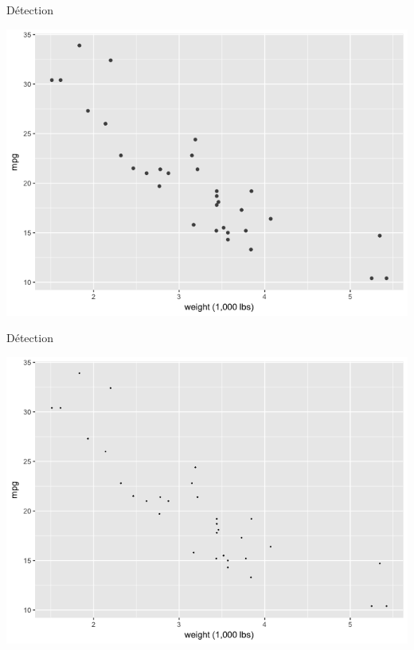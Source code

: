 \documentclass[french]{beamer}
\begin{document}
\begin{frame}{Détection}
\begin{center}
	\includegraphics[height=0.8\textheight]{det}
\end{center}
\end{frame}

\begin{frame}{Détection}
\begin{center}
	\includegraphics[height=0.8\textheight]{det2}
\end{center}
\end{frame}
\end{document}

